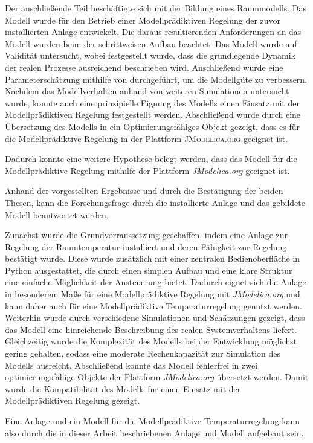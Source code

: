 Der anschließende Teil beschäftigte sich mit der Bildung eines Raummodells. Das Modell wurde für den Betrieb einer Modellprädiktiven Regelung der zuvor installierten Anlage entwickelt. Die daraus resultierenden Anforderungen an das Modell wurden beim der schrittweisen Aufbau beachtet. Das Modell wurde auf Validität untersucht, wobei festgestellt wurde, dass die grundlegende Dynamik der realen Prozesse ausreichend beschrieben wird. Anschließend wurde eine Parameterschätzung mithilfe von \cite{casiopeia} durchgeführt, um die Modellgüte zu verbessern. Nachdem das Modellverhalten anhand von weiteren Simulationen untersucht wurde, konnte auch eine prinzipielle Eignung des Modells einen Einsatz mit der Modellprädiktiven Regelung festgestellt werden. Abschließend wurde durch eine Übersetzung des Modells in ein Optimierungsfähiges Objekt gezeigt, dass es für die Modellprädiktive Regelung in der Plattform \textsc{JModelica.org} geeignet ist.


Dadurch konnte eine weitere Hypothese belegt werden, dass das Modell für die Modellprädiktive Regelung mithilfe der Plattform \textit{JModelica.org} geeignet ist.

Anhand der vorgestellten Ergebnisse und durch die Bestätigung der beiden Thesen, kann die Forschungsfrage durch die installierte Anlage und das gebildete Modell beantwortet werden.

Zunächst wurde die Grundvorraussetzung geschaffen, indem eine Anlage zur Regelung der Raumtemperatur installiert und deren Fähigkeit zur Regelung bestätigt wurde. Diese wurde zusätzlich mit einer zentralen Bedienoberfläche in Python ausgestattet, die durch einen simplen Aufbau und eine klare Struktur eine einfache Möglichkeit der Ansteuerung bietet. Dadurch eignet sich die Anlage in besonderem Maße für eine Modellprädiktive Regelung mit \textit{JModelica.org} und kann daher auch für eine Modellprädiktive Temperaturregelung genutzt werden. 
Weiterhin wurde durch verschiedene Simulationen und Schätzungen gezeigt, dass das Modell eine hinreichende Beschreibung des realen Systemverhaltens liefert. Gleichzeitig wurde die Komplexität des Modells bei der Entwicklung möglichst gering gehalten, sodass eine moderate Rechenkapazität zur Simulation des Modells ausreicht. Abschließend konnte das Modell fehlerfrei in zwei optimierungsfähige Objekte der Plattform \textit{JModelica.org} übersetzt werden. Damit wurde die Kompatibilität des Modells für einen Einsatz mit der Modellprädiktiven Regelung gezeigt.

Eine Anlage und ein Modell für die Modellprädiktive Temperaturregelung kann also durch die in dieser Arbeit beschriebenen Anlage und Modell aufgebaut sein.

